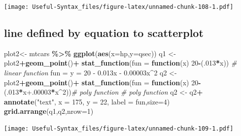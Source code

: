 \documentclass[
]{article}
\newenvironment{Shaded}{\begin{snugshade}}{\end{snugshade}}
\newcommand{\AttributeTok}[1]{\textcolor[rgb]{0.13,0.29,0.53}{#1}}
\newcommand{\CommentTok}[1]{\textcolor[rgb]{0.56,0.35,0.01}{\textit{#1}}}
\newcommand{\ControlFlowTok}[1]{\textcolor[rgb]{0.13,0.29,0.53}{\textbf{#1}}}
\newcommand{\DecValTok}[1]{\textcolor[rgb]{0.00,0.00,0.81}{#1}}
\newcommand{\FloatTok}[1]{\textcolor[rgb]{0.00,0.00,0.81}{#1}}
\newcommand{\FunctionTok}[1]{\textcolor[rgb]{0.13,0.29,0.53}{\textbf{#1}}}
\newcommand{\NormalTok}[1]{#1}
\newcommand{\OtherTok}[1]{\textcolor[rgb]{0.56,0.35,0.01}{#1}}
\newcommand{\SpecialCharTok}[1]{\textcolor[rgb]{0.81,0.36,0.00}{\textbf{#1}}}
\newcommand{\StringTok}[1]{\textcolor[rgb]{0.31,0.60,0.02}{#1}}
\begin{document}
\texttt{[image: Useful-Syntax\_files/figure-latex/unnamed-chunk-108-1.pdf]}

\hypertarget{line-defined-by-equation-to-scatterplot}{%
\subsection{line defined by equation to scatterplot}\label{line-defined-by-equation-to-scatterplot}}

\begin{Shaded}
\begin{Highlighting}[]
\NormalTok{plot2}\OtherTok{\textless{}{-}}\NormalTok{ mtcars }\SpecialCharTok{\%\textgreater{}\%} \FunctionTok{ggplot}\NormalTok{(}\FunctionTok{aes}\NormalTok{(}\AttributeTok{x=}\NormalTok{hp,}\AttributeTok{y=}\NormalTok{qsec))}
\NormalTok{q1 }\OtherTok{\textless{}{-}}\NormalTok{ plot2}\SpecialCharTok{+}\FunctionTok{geom\_point}\NormalTok{()}\SpecialCharTok{+}
    \FunctionTok{stat\_function}\NormalTok{(}\AttributeTok{fun =} \ControlFlowTok{function}\NormalTok{(x) }\DecValTok{20}\SpecialCharTok{{-}}\NormalTok{(.}\DecValTok{013}\SpecialCharTok{*}\NormalTok{x)) }\CommentTok{\# linear function}
\NormalTok{fun }\OtherTok{=} \StringTok{\textquotesingle{}y = 20 {-} 0.013x {-} 0.00003x\^{}2\textquotesingle{}}
\NormalTok{q2 }\OtherTok{\textless{}{-}}\NormalTok{ plot2}\SpecialCharTok{+}\FunctionTok{geom\_point}\NormalTok{()}\SpecialCharTok{+}    \FunctionTok{stat\_function}\NormalTok{(}\AttributeTok{fun =} \ControlFlowTok{function}\NormalTok{(x) }\DecValTok{20}\SpecialCharTok{{-}}\NormalTok{(.}\DecValTok{013}\SpecialCharTok{*}\NormalTok{x}\FloatTok{+.00003}\SpecialCharTok{*}\NormalTok{x}\SpecialCharTok{\^{}}\DecValTok{2}\NormalTok{))}\CommentTok{\# poly function}
 \CommentTok{\# poly function}
\NormalTok{q2 }\OtherTok{\textless{}{-}}\NormalTok{ q2}\SpecialCharTok{+} \FunctionTok{annotate}\NormalTok{(}\StringTok{"text"}\NormalTok{, }\AttributeTok{x =} \DecValTok{175}\NormalTok{, }\AttributeTok{y =} \DecValTok{22}\NormalTok{, }\AttributeTok{label =}\NormalTok{ fun,}\AttributeTok{size=}\DecValTok{4}\NormalTok{)}
\FunctionTok{grid.arrange}\NormalTok{(q1,q2,}\AttributeTok{nrow=}\DecValTok{1}\NormalTok{)}
\end{Highlighting}
\end{Shaded}

\texttt{[image: Useful-Syntax\_files/figure-latex/unnamed-chunk-109-1.pdf]}
\end{document}
